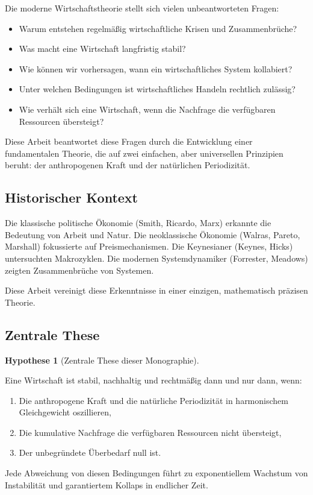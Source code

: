 \documentclass[a4paper, 12pt, twoside, openright]{report}
\theoremstyle{definition}
\theoremstyle{definition}
\newtheorem{hypothese}{Hypothese}[chapter]
\begin{document}
Die moderne Wirtschaftstheorie stellt sich vielen unbeantworteten Fragen:

\begin{itemize}
    \item Warum entstehen regelmäßig wirtschaftliche Krisen und Zusammenbrüche?
    \item Was macht eine Wirtschaft langfristig stabil?
    \item Wie können wir vorhersagen, wann ein wirtschaftliches System kollabiert?
    \item Unter welchen Bedingungen ist wirtschaftliches Handeln rechtlich zulässig?
    \item Wie verhält sich eine Wirtschaft, wenn die Nachfrage die verfügbaren Ressourcen übersteigt?
\end{itemize}

Diese Arbeit beantwortet diese Fragen durch die Entwicklung einer fundamentalen Theorie, die auf zwei einfachen, aber universellen Prinzipien beruht: der anthropogenen Kraft und der natürlichen Periodizität.

\subsection{Historischer Kontext}

Die klassische politische Ökonomie (Smith, Ricardo, Marx) erkannte die Bedeutung von Arbeit und Natur. Die neoklassische Ökonomie (Walras, Pareto, Marshall) fokussierte auf Preismechanismen. Die Keynesianer (Keynes, Hicks) untersuchten Makrozyklen. Die modernen Systemdynamiker (Forrester, Meadows) zeigten Zusammenbrüche von Systemen.

Diese Arbeit vereinigt diese Erkenntnisse in einer einzigen, mathematisch präzisen Theorie.

\subsection{Zentrale These}

\begin{hypothese}[Zentrale These dieser Monographie]
    \label{hyp:zentral}
    
    Eine Wirtschaft ist stabil, nachhaltig und rechtmäßig dann und nur dann, wenn:
    
    \begin{enumerate}
        \item Die anthropogene Kraft und die natürliche Periodizität in harmonischem Gleichgewicht oszillieren,
        \item Die kumulative Nachfrage die verfügbaren Ressourcen nicht übersteigt,
        \item Der unbegründete Überbedarf null ist.
    \end{enumerate}
    
    Jede Abweichung von diesen Bedingungen führt zu exponentiellem Wachstum von Instabilität und garantiertem Kollaps in endlicher Zeit.
\end{hypothese}
\end{document}

